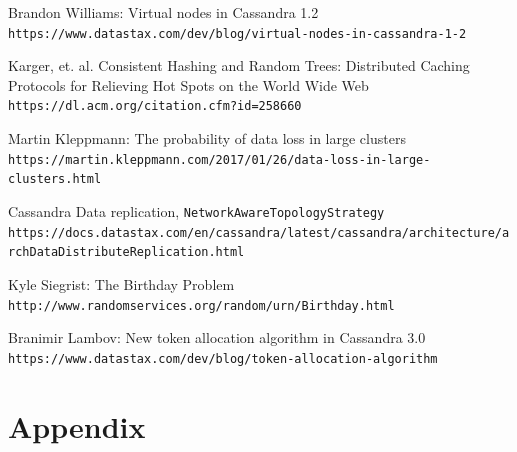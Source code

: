 \documentclass{article}
\begin{document}
\begin{thebibliography}{9}

Brandon Williams: Virtual nodes in Cassandra 1.2
\\\texttt{https://www.datastax.com/dev/blog/virtual-nodes-in-cassandra-1-2}

Karger, et. al. Consistent Hashing and Random Trees: Distributed Caching Protocols for Relieving Hot Spots on the World Wide Web
\\\texttt{https://dl.acm.org/citation.cfm?id=258660}

Martin Kleppmann: The probability of data loss in large clusters
\\\texttt{https://martin.kleppmann.com/2017/01/26/data-loss-in-large-clusters.html}

Cassandra Data replication, \texttt{NetworkAwareTopologyStrategy}
\texttt{https://docs.datastax.com/en/cassandra/latest/cassandra/architecture/archDataDistributeReplication.html}

Kyle Siegrist: The Birthday Problem
\\\texttt{http://www.randomservices.org/random/urn/Birthday.html}

Branimir Lambov: New token allocation algorithm in Cassandra 3.0
\\\texttt{https://www.datastax.com/dev/blog/token-allocation-algorithm}



\end{thebibliography}


\section{Appendix}
\end{document}
